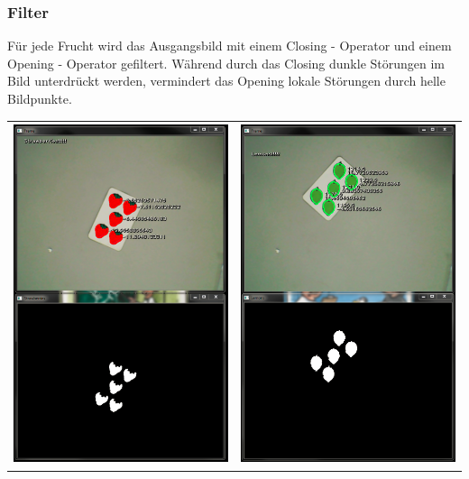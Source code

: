 \subsubsection{Filter}

Für jede Frucht wird das Ausgangsbild mit einem Closing - Operator und einem Opening - Operator gefiltert. Während durch das Closing dunkle Störungen im Bild unterdrückt werden, vermindert das Opening lokale Störungen durch helle Bildpunkte.  \\


\begin{center}
\begin{tabular}{cc}
\includegraphics[height=10cm]{Abbildungen/Erdbeere01} & \includegraphics[height=10cm]{Abbildungen/Limonen01} \\ 

\end{tabular}
\end{center}
